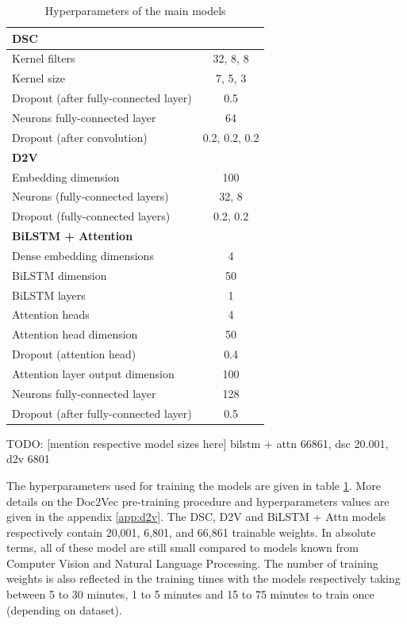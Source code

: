 \begin{table}[h!]
	\centering
	\begin{tabular}{| l | c |} 
		\hline
		\textbf{DSC}\\
		\hline
		Kernel filters & 32, 8, 8 \\
		Kernel size & 7, 5, 3 \\
		Dropout (after fully-connected layer) & 0.5\\
		Neurons fully-connected layer & 64 \\
		Dropout (after convolution) & 0.2, 0.2, 0.2\\
		\hline
		\textbf{D2V}\\
		\hline
		Embedding dimension & 100\\
		Neurons (fully-connected layers) & 32, 8\\
		Dropout (fully-connected layers) & 0.2, 0.2\\
		\hline
		\textbf{BiLSTM + Attention} \\
		\hline
		Dense embedding dimensions & 4\\
		BiLSTM dimension & 50\\
		BiLSTM layers & 1\\
		Attention heads & 4\\
		Attention head dimension & 50\\
		Dropout (attention head) & 0.4 \\
		Attention layer output dimension & 100\\
		Neurons fully-connected layer & 128\\
		Dropout (after fully-connected layer) & 0.5\\
		\hline
	\end{tabular}
	\caption{Hyperparameters of the main models
	}
	\label{table:hyperparameters}
\end{table}

TODO: [mention respective model sizes here]
bilstm + attn 66861, dsc 20.001, d2v 6801

The hyperparameters used for training the models are given in table \ref{table:hyperparameters}. More details on the Doc2Vec pre-training procedure and hyperparameters values are given in the appendix \ref{app:d2v}.
The DSC, D2V and BiLSTM + Attn models respectively contain 20,001, 6,801, and 66,861 trainable weights. In absolute terms, all of these model are still small compared to models known from Computer Vision and Natural Language Processing. The number of training weights is also reflected in the training times with the models respectively taking between 5 to 30 minutes, 1 to 5 minutes and 15 to 75 minutes to train once (depending on dataset). 

 
